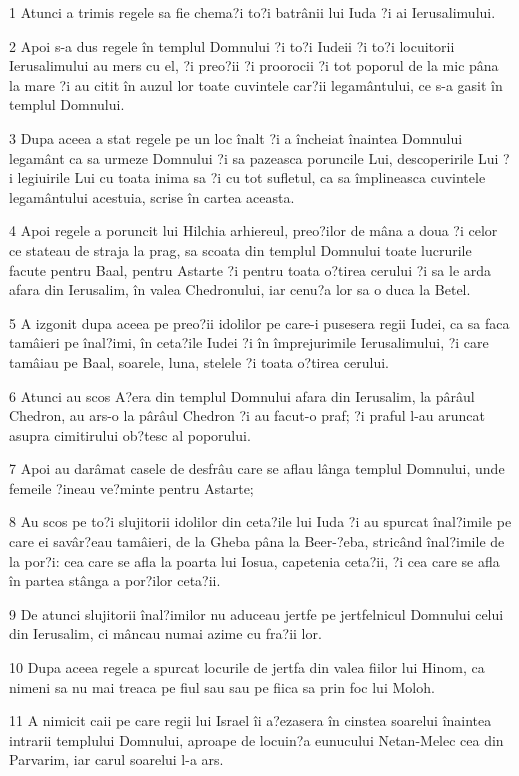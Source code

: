 \par 1 Atunci a trimis regele sa fie chema?i to?i batrânii lui Iuda ?i ai Ierusalimului.
\par 2 Apoi s-a dus regele în templul Domnului ?i to?i Iudeii ?i to?i locuitorii Ierusalimului au mers cu el, ?i preo?ii ?i proorocii ?i tot poporul de la mic pâna la mare ?i au citit în auzul lor toate cuvintele car?ii legamântului, ce s-a gasit în templul Domnului.
\par 3 Dupa aceea a stat regele pe un loc înalt ?i a încheiat înaintea Domnului legamânt ca sa urmeze Domnului ?i sa pazeasca poruncile Lui, descoperirile Lui ?i legiuirile Lui cu toata inima sa ?i cu tot sufletul, ca sa împlineasca cuvintele legamântului acestuia, scrise în cartea aceasta.
\par 4 Apoi regele a poruncit lui Hilchia arhiereul, preo?ilor de mâna a doua ?i celor ce stateau de straja la prag, sa scoata din templul Domnului toate lucrurile facute pentru Baal, pentru Astarte ?i pentru toata o?tirea cerului ?i sa le arda afara din Ierusalim, în valea Chedronului, iar cenu?a lor sa o duca la Betel.
\par 5 A izgonit dupa aceea pe preo?ii idolilor pe care-i pusesera regii Iudei, ca sa faca tamâieri pe înal?imi, în ceta?ile Iudei ?i în împrejurimile Ierusalimului, ?i care tamâiau pe Baal, soarele, luna, stelele ?i toata o?tirea cerului.
\par 6 Atunci au scos A?era din templul Domnului afara din Ierusalim, la pârâul Chedron, au ars-o la pârâul Chedron ?i au facut-o praf; ?i praful l-au aruncat asupra cimitirului ob?tesc al poporului.
\par 7 Apoi au darâmat casele de desfrâu care se aflau lânga templul Domnului, unde femeile ?ineau ve?minte pentru Astarte;
\par 8 Au scos pe to?i slujitorii idolilor din ceta?ile lui Iuda ?i au spurcat înal?imile pe care ei savâr?eau tamâieri, de la Gheba pâna la Beer-?eba, stricând înal?imile de la por?i: cea care se afla la poarta lui Iosua, capetenia ceta?ii, ?i cea care se afla în partea stânga a por?ilor ceta?ii.
\par 9 De atunci slujitorii înal?imilor nu aduceau jertfe pe jertfelnicul Domnului celui din Ierusalim, ci mâncau numai azime cu fra?ii lor.
\par 10 Dupa aceea regele a spurcat locurile de jertfa din valea fiilor lui Hinom, ca nimeni sa nu mai treaca pe fiul sau sau pe fiica sa prin foc lui Moloh.
\par 11 A nimicit caii pe care regii lui Israel îi a?ezasera în cinstea soarelui înaintea intrarii templului Domnului, aproape de locuin?a eunucului Netan-Melec cea din Parvarim, iar carul soarelui l-a ars.
